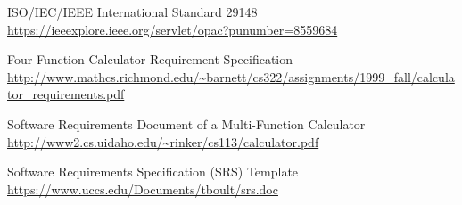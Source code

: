 \documentclass[a4paper, 11pt]{article}
\begin{document}
\begin{thebibliography}{9}

ISO/IEC/IEEE International Standard 29148\\
\url{https://ieeexplore.ieee.org/servlet/opac?punumber=8559684}

Four Function Calculator Requirement Specification\\
\url{http://www.mathcs.richmond.edu/~barnett/cs322/assignments/1999_fall/calculator_requirements.pdf}

Software Requirements Document of a Multi-Function Calculator\\
\url{http://www2.cs.uidaho.edu/~rinker/cs113/calculator.pdf}

Software Requirements Specification (SRS) Template\\
\url{https://www.uccs.edu/Documents/tboult/srs.doc}

\end{thebibliography}
 
 
\end{document}
